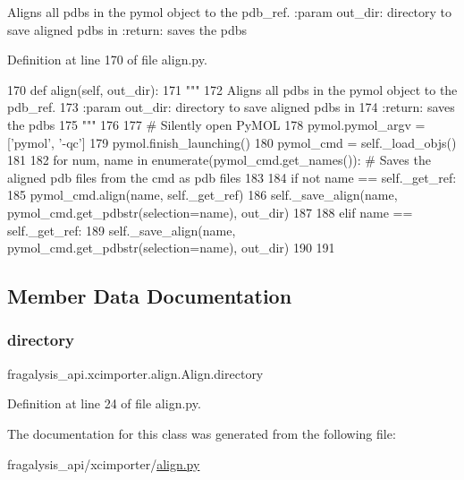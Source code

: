 \begin{DoxyVerb}Aligns all pdbs in the pymol object to the pdb_ref.
:param out_dir: directory to save aligned pdbs in
:return: saves the pdbs
\end{DoxyVerb}
 

Definition at line 170 of file align.\+py.


\begin{DoxyCode}
170     \textcolor{keyword}{def }align(self, out\_dir):
171         \textcolor{stringliteral}{"""}
172 \textcolor{stringliteral}{        Aligns all pdbs in the pymol object to the pdb\_ref.}
173 \textcolor{stringliteral}{        :param out\_dir: directory to save aligned pdbs in}
174 \textcolor{stringliteral}{        :return: saves the pdbs}
175 \textcolor{stringliteral}{        """}
176 
177         \textcolor{comment}{# Silently open PyMOL}
178         pymol.pymol\_argv = [\textcolor{stringliteral}{'pymol'}, \textcolor{stringliteral}{'-qc'}]
179         pymol.finish\_launching()
180         pymol\_cmd = self.\_load\_objs()
181 
182         \textcolor{keywordflow}{for} num, name \textcolor{keywordflow}{in} enumerate(pymol\_cmd.get\_names()):  \textcolor{comment}{# Saves the aligned pdb files from the cmd as
       pdb files}
183 
184             \textcolor{keywordflow}{if} \textcolor{keywordflow}{not} name == self.\_get\_ref:
185                 pymol\_cmd.align(name, self.\_get\_ref)
186                 self.\_save\_align(name, pymol\_cmd.get\_pdbstr(selection=name), out\_dir)
187 
188             \textcolor{keywordflow}{elif} name == self.\_get\_ref:
189                 self.\_save\_align(name, pymol\_cmd.get\_pdbstr(selection=name), out\_dir)
190 
191 
\end{DoxyCode}


\subsection{Member Data Documentation}
\mbox{\label{classfragalysis__api_1_1xcimporter_1_1align_1_1_align_aaa8ff46caee489ab4cab5279ac946bcc}} 
\subsubsection{\texorpdfstring{directory}{directory}}
{\footnotesize\ttfamily fragalysis\+\_\+api.\+xcimporter.\+align.\+Align.\+directory}



Definition at line 24 of file align.\+py.



The documentation for this class was generated from the following file\+:\begin{DoxyCompactItemize}
\item 
fragalysis\+\_\+api/xcimporter/\hyperlink{align_8py}{align.\+py}\end{DoxyCompactItemize}
